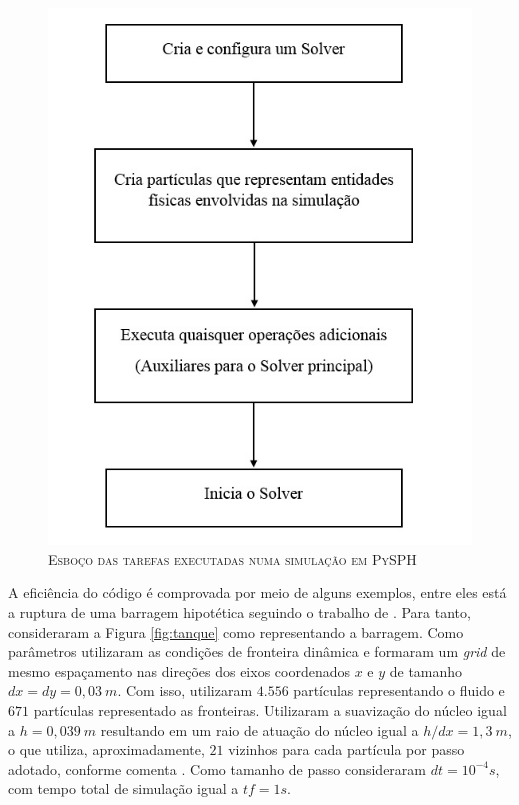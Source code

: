 \begin{figure}[H]
\centering
\includegraphics[scale=0.8]{figuras/diagrama.jpg}
\caption{\textsc{Esboço das tarefas executadas numa simulação em PySPH}}
\vspace{-0.1cm}
\label{fig:diagrama}
\end{figure}

A eficiência do código é comprovada por meio de alguns exemplos, entre eles está a ruptura de uma barragem hipotética seguindo o trabalho de . Para tanto, consideraram a Figura \ref{fig:tanque} como representando a barragem. Como parâmetros utilizaram as condições de fronteira dinâmica e formaram um \textit{grid} de mesmo espaçamento nas direções dos eixos coordenados $x$ e $y$ de tamanho $dx=dy=0,03 \ m$. Com isso, utilizaram $4.556$ partículas representando o fluido e $671$ partículas representado as fronteiras. Utilizaram a suavização do núcleo igual a $h=0,039 \ m$ resultando em um raio de atuação do núcleo igual a $h/dx=1,3 \ m$, o que utiliza, aproximadamente, $21$ vizinhos para cada partícula por passo adotado, conforme comenta . Como tamanho de passo consideraram $dt=10^{-4}s$, com tempo total de simulação igual a $tf=1s$.

